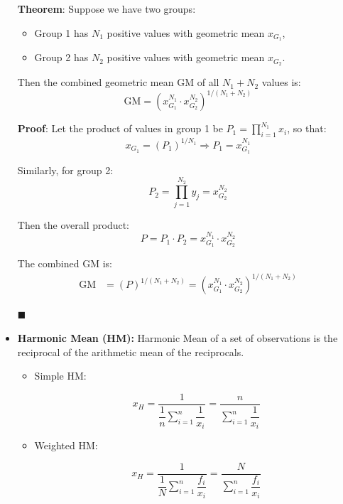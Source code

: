 \documentclass[twoside]{book}
\begin{document}
\begin{itemize}
\begin{textbox}
\textbf{Theorem}: Suppose we have two groups:
\begin{itemize}
  \item Group 1 has \( N_1 \) positive values with geometric mean \( x_{G_1} \),
  \item Group 2 has \( N_2 \) positive values with geometric mean \( x_{G_2} \).
\end{itemize}
Then the combined geometric mean \( \mathrm{GM} \) of all \( N_1 + N_2 \) values is:
\[
\mathrm{GM} = \left( x_{G_1}^{N_1} \cdot x_{G_2}^{N_2} \right)^{1/(N_1 + N_2)}
\]
\end{textbox}

\textbf{Proof}: Let the product of values in group 1 be \( P_1 = \prod_{i=1}^{N_1} x_i \), so that:
\[
x_{G_1} = \left( P_1 \right)^{1/N_1} \Rightarrow P_1 = x_{G_1}^{N_1}
\]

Similarly, for group 2:
\[
P_2 = \prod_{j=1}^{N_2} y_j = x_{G_2}^{N_2}
\]

Then the overall product:
\[
P = P_1 \cdot P_2 = x_{G_1}^{N_1} \cdot x_{G_2}^{N_2}
\]

The combined GM is:
\begin{align*}
\mathrm{GM} &= \left( P \right)^{1/(N_1 + N_2)} = \left( x_{G_1}^{N_1} \cdot x_{G_2}^{N_2} \right)^{1/(N_1 + N_2)}
\end{align*}

\hfill $\blacksquare$

    \item \textbf{Harmonic Mean (HM):} Harmonic Mean of a set of observations is the reciprocal of the arithmetic mean of the reciprocals.
    \begin{itemize}
        \item Simple HM:
        \begin{textbox}
    \[
    x_H = \dfrac{1}{ \dfrac{1}{n}\displaystyle \sum_{i=1}^{n} \dfrac{1}{x_i}} = \dfrac{n}{\displaystyle \sum_{i=1}^{n} \dfrac{1}{x_i}}
    \]
    \end{textbox}
    \item Weighted HM:
    \begin{textbox}
    \[
    x_H = \dfrac{1}{ \dfrac{1}{N}\displaystyle \sum_{i=1}^{n} \dfrac{f_i}{x_i}} = \dfrac{N}{\displaystyle \sum_{i=1}^{n} \dfrac{f_i}{x_i}}
    \]
    \end{textbox}
    \end{itemize}

\end{itemize}
\end{document}
